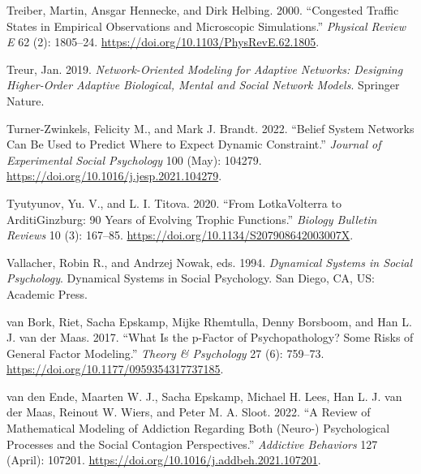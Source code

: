 \documentclass[
  letterpaper,
]{scrbook}
\newlength{\cslhangindent}
\newlength{\cslentryspacingunit} %
\newenvironment{CSLReferences}[2] %
 {%
  \setlength{\parindent}{0pt}
  \ifodd #1
  \let\oldpar\par
  \def\par{\hangindent=\cslhangindent\oldpar}
  \fi
  \setlength{\parskip}{#2\cslentryspacingunit}
 }%
 {}
\begin{document}
\begin{CSLReferences}{1}{0}
\leavevmode{}%
Treiber, Martin, Ansgar Hennecke, and Dirk Helbing. 2000. {``Congested
Traffic States in Empirical Observations and Microscopic Simulations.''}
\emph{Physical Review E} 62 (2): 1805--24.
\url{https://doi.org/10.1103/PhysRevE.62.1805}.

\leavevmode{}%
Treur, Jan. 2019. \emph{Network-{Oriented Modeling} for {Adaptive
Networks}: {Designing Higher-Order Adaptive Biological}, {Mental} and
{Social Network Models}}. {Springer Nature}.

\leavevmode{}%
Turner-Zwinkels, Felicity M., and Mark J. Brandt. 2022. {``Belief System
Networks Can Be Used to Predict Where to Expect Dynamic Constraint.''}
\emph{Journal of Experimental Social Psychology} 100 (May): 104279.
\url{https://doi.org/10.1016/j.jesp.2021.104279}.

\leavevmode{}%
Tyutyunov, Yu. V., and L. I. Titova. 2020. {``From
Lotka{\textendash}Volterra to Arditi{\textendash}Ginzburg: 90 Years of
Evolving Trophic Functions.''} \emph{Biology Bulletin Reviews} 10 (3):
167--85. \url{https://doi.org/10.1134/S207908642003007X}.

\leavevmode{}%
Vallacher, Robin R., and Andrzej Nowak, eds. 1994. \emph{Dynamical
Systems in Social Psychology}. Dynamical Systems in Social Psychology.
{San Diego, CA, US}: {Academic Press}.

\leavevmode{}%
van Bork, Riet, Sacha Epskamp, Mijke Rhemtulla, Denny Borsboom, and Han
L. J. van der Maas. 2017. {``What Is the p-Factor of Psychopathology?
{Some} Risks of General Factor Modeling.''} \emph{Theory \& Psychology}
27 (6): 759--73. \url{https://doi.org/10.1177/0959354317737185}.

\leavevmode{}%
van den Ende, Maarten W. J., Sacha Epskamp, Michael H. Lees, Han L. J.
van der Maas, Reinout W. Wiers, and Peter M. A. Sloot. 2022. {``A Review
of Mathematical Modeling of Addiction Regarding Both (Neuro-)
Psychological Processes and the Social Contagion Perspectives.''}
\emph{Addictive Behaviors} 127 (April): 107201.
\url{https://doi.org/10.1016/j.addbeh.2021.107201}.


\end{CSLReferences}
\end{document}
